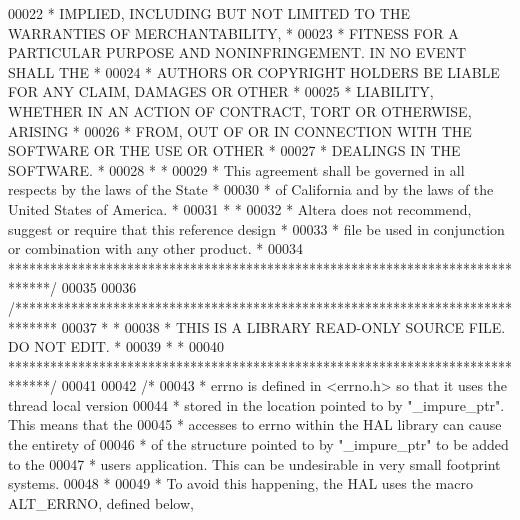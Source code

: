 \begin{DoxyCode}
00022 \textcolor{comment}{* IMPLIED, INCLUDING BUT NOT LIMITED TO THE WARRANTIES OF MERCHANTABILITY,    *}
00023 \textcolor{comment}{* FITNESS FOR A PARTICULAR PURPOSE AND NONINFRINGEMENT. IN NO EVENT SHALL THE *}
00024 \textcolor{comment}{* AUTHORS OR COPYRIGHT HOLDERS BE LIABLE FOR ANY CLAIM, DAMAGES OR OTHER      *}
00025 \textcolor{comment}{* LIABILITY, WHETHER IN AN ACTION OF CONTRACT, TORT OR OTHERWISE, ARISING     *}
00026 \textcolor{comment}{* FROM, OUT OF OR IN CONNECTION WITH THE SOFTWARE OR THE USE OR OTHER         *}
00027 \textcolor{comment}{* DEALINGS IN THE SOFTWARE.                                                   *}
00028 \textcolor{comment}{*                                                                             *}
00029 \textcolor{comment}{* This agreement shall be governed in all respects by the laws of the State   *}
00030 \textcolor{comment}{* of California and by the laws of the United States of America.              *}
00031 \textcolor{comment}{*                                                                             *}
00032 \textcolor{comment}{* Altera does not recommend, suggest or require that this reference design    *}
00033 \textcolor{comment}{* file be used in conjunction or combination with any other product.          *}
00034 \textcolor{comment}{******************************************************************************/}
00035 
00036 \textcolor{comment}{/******************************************************************************}
00037 \textcolor{comment}{*                                                                             *}
00038 \textcolor{comment}{* THIS IS A LIBRARY READ-ONLY SOURCE FILE. DO NOT EDIT.                       *}
00039 \textcolor{comment}{*                                                                             *}
00040 \textcolor{comment}{******************************************************************************/}
00041 
00042 \textcolor{comment}{/*}
00043 \textcolor{comment}{ * errno is defined in <errno.h> so that it uses the thread local version }
00044 \textcolor{comment}{ * stored in the location pointed to by "\_impure\_ptr". This means that the }
00045 \textcolor{comment}{ * accesses to errno within the HAL library can cause the entirety of }
00046 \textcolor{comment}{ * of the structure pointed to by "\_impure\_ptr" to be added to the }
00047 \textcolor{comment}{ * users application. This can be undesirable in very small footprint systems.}
00048 \textcolor{comment}{ *}
00049 \textcolor{comment}{ * To avoid this happening, the HAL uses the macro ALT\_ERRNO, defined below,}

\end{DoxyCode}
